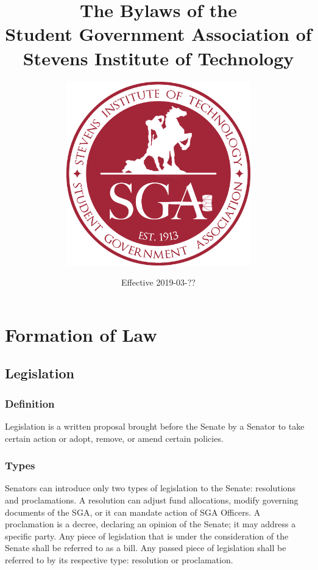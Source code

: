 \documentclass[12pt]{scrreprt}
\begin{document}
\title{The Bylaws of the \\ Student Government Association of \\ Stevens Institute of Technology}
\subtitle{
    \vspace{1cm}
    \includegraphics[width=0.6\textwidth]{logo}
}
\date{Effective 2019-03-??}
\maketitle

\tableofcontents

\modulolinenumbers[1]
\linenumbers

\chapter{Formation of Law}

\section{Legislation}

\subsection{Definition}
Legislation is a written proposal brought before the Senate by a Senator to take certain action or adopt, remove, or amend certain policies.

\subsection{Types}
Senators can introduce only two types of legislation to the Senate: resolutions and proclamations. A resolution can adjust fund allocations, modify governing documents of the SGA, or it can mandate action of SGA Officers. A proclamation is a decree, declaring an opinion of the Senate; it may address a specific party. Any piece of legislation that is under the consideration of the Senate shall be referred to as a bill. Any passed piece of legislation shall be referred to by its respective type: resolution or proclamation.
\end{document}
